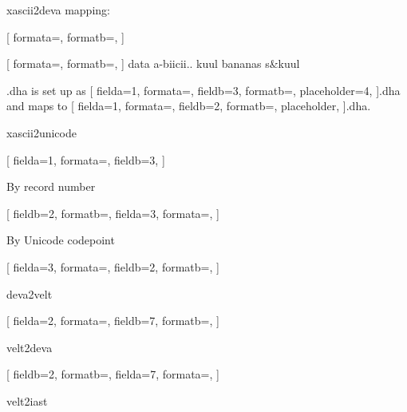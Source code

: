 \documentclass{article}
\begin{document}
xascii2deva mapping:

\setlength{\columnseprule}{0.4pt}
\begin{multicols}{4}
[
formata=,
formatb=\fdevb\Large,
]
\end{multicols}

[
formata=,
formatb=\fdevb,
]
{data a-biicii..  kuul bananas s\&kuul }

.dha is set up as 
[
fielda=1,
formata=,
fieldb=3,
formatb=\fdevb,%
placeholder=4,
]{.dha}
and maps to
[
fielda=1,
formata=,
fieldb=2,
formatb=\fdevb,
placeholder,
]{.dha}.


\newpage
xascii2unicode

[
fielda=1,
formata=,
fieldb=3,
]


\newpage
By record number


[
fieldb=2,
formatb=\fdevb\Large,
fielda=3,
formata=\small,
]



\newpage
By Unicode codepoint


[
fielda=3,
formata=\small,
fieldb=2,
formatb=\fdevb\huge\color{blue},
]

\newpage
deva2velt


\begin{multicols}{4}
[
fielda=2,
formata=\fdevb,
fieldb=7,
formatb=\small,
]
\end{multicols}

\newpage
velt2deva



\begin{multicols}{4}
[
fieldb=2,
formatb=\fdevb,
fielda=7,
formata=\small,
]
\end{multicols}


\newpage
velt2iast
\end{document}
